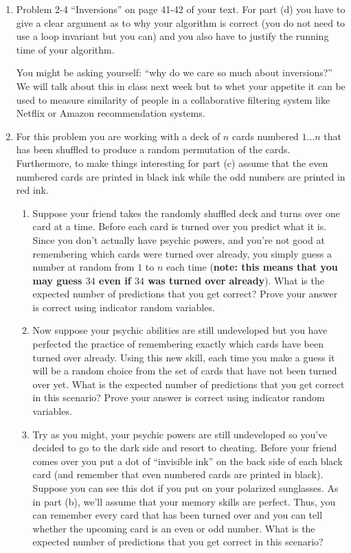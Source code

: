 \documentclass[11pt]{article}
\begin{document}
\begin{enumerate}
\begin{enumerate}[a)]
\end{enumerate}


\item Problem 2-4 ``Inversions'' on page 41-42 of your text.  For part (d) you have to give a clear argument as to why your algorithm is correct (you do not need to use a loop invariant but you can) and you also have to justify the running time of your algorithm.   

You might be asking yourself: ``why do we care so much about inversions?''   We will talk about this in class next week but to whet your appetite it can be used to measure similarity of people in a collaborative filtering system like Netflix or Amazon recommendation systems.  

\newpage

\item For this problem you are working with a deck of $n$ cards numbered $1 \ldots n$ that has been shuffled to produce a random permutation of the cards.   Furthermore, to make things interesting for part (c) assume that the even numbered cards are printed in black ink while the odd numbers are printed in red ink.  

\begin{enumerate}

\item Suppose your friend takes the randomly shuffled deck and turns over one card at a time.  Before each card is turned over you predict what it is.  Since you don't actually have psychic powers, and you're not good at remembering which cards were turned over already, you simply guess a number at random from $1$ to $n$ each time (\textbf{note: this means that you may guess $34$ even if $34$ was turned over already}). What is the expected number of predictions that you get correct?  Prove your answer is correct using indicator random variables.  

\item Now suppose your psychic abilities are still undeveloped but you have perfected the practice of remembering exactly which cards have been turned over already.  Using this new skill, each time you make a guess it will be a random choice from the set of cards that have not been turned over yet.  What is the expected number of predictions that you get correct in this scenario?  Prove your answer is correct using indicator random variables.

\item Try as you might, your psychic powers are still undeveloped so you've decided to go to the dark side and resort to cheating.  Before your friend comes over you put a dot of ``invisible ink''  on the back side of each black card (and remember that even numbered cards are printed in black).  Suppose you can see this dot if you put on your polarized sunglasses.  As in part (b), we'll assume that your memory skills are perfect.  Thus, you can remember every card that has been turned over and you can tell whether the upcoming card is an even or odd number.   What is the expected number of predictions that you get correct in this scenario?   


\end{enumerate}
\end{enumerate}
\end{document}
